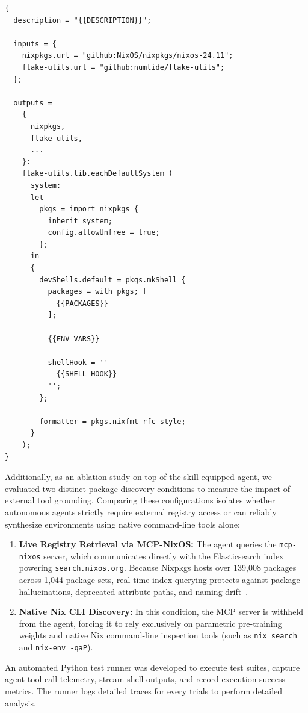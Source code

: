 \begin{lstlisting}[caption={\texttt{assets/flake-devshell.template.nix} Template}]
{
  description = "{{DESCRIPTION}}";

  inputs = {
    nixpkgs.url = "github:NixOS/nixpkgs/nixos-24.11";
    flake-utils.url = "github:numtide/flake-utils";
  };

  outputs =
    {
      nixpkgs,
      flake-utils,
      ...
    }:
    flake-utils.lib.eachDefaultSystem (
      system:
      let
        pkgs = import nixpkgs {
          inherit system;
          config.allowUnfree = true;
        };
      in
      {
        devShells.default = pkgs.mkShell {
          packages = with pkgs; [
            {{PACKAGES}}
          ];

          {{ENV_VARS}}

          shellHook = ''
            {{SHELL_HOOK}}
          '';
        };

        formatter = pkgs.nixfmt-rfc-style;
      }
    );
}

\end{lstlisting}

Additionally, as an ablation study on top of the skill-equipped agent, we evaluated
two distinct package discovery conditions to measure the impact of external tool grounding.
Comparing these configurations isolates whether autonomous agents strictly
require external registry access or can reliably synthesize environments using
native command-line tools alone:
\begin{enumerate}
	\item \textbf{Live Registry Retrieval via MCP-NixOS:} The agent queries the
	      \texttt{mcp-nixos} server, which communicates directly with the
	      Elasticsearch index powering \texttt{search.nixos.org}. Because Nixpkgs
	      hosts over 139,008 packages across 1,044 package sets, real-time index querying
	      protects against package hallucinations, deprecated attribute paths, and naming
	      drift~\cite{borkLanguageServerProtocol2023,ImportingPhantomsMeasuring}.

	\item \textbf{Native Nix CLI Discovery:} In this condition, the MCP server is
	      withheld from the agent, forcing it to rely exclusively on parametric
	      pre-training weights and native Nix command-line inspection tools (such as
	      \texttt{nix search} and \texttt{nix-env -qaP}).
\end{enumerate}

An automated Python test runner was developed to execute test suites, capture agent
tool call telemetry, stream shell outputs, and record execution success metrics.
The runner logs detailed traces for every trials to perform detailed analysis.

